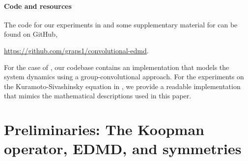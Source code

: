 \documentclass[preprint,12pt,authoryear]{elsarticle}
\begin{document}
\paragraph{Code and resources} The code for our experiments in  and some supplementary material for  can be found on GitHub, \begin{center}
   \url{https://github.com/graps1/convolutional-edmd}. 
\end{center} 
For the case of , our codebase contains an implementation that models the system dynamics using a group-convolutional approach. For the experiments on the Kuramoto-Sivashinsky equation in , we provide a readable implementation that mimics the mathematical descriptions used in this paper.



\section{Preliminaries: The Koopman operator, EDMD, and symmetries}\label{sec:preliminaries}
\end{document}
